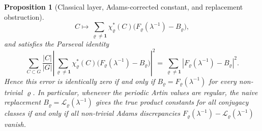 \documentclass[11pt,a4paper]{amsart}
\theoremstyle{plain}
\newtheorem{proposition}[theorem]{Proposition}
\theoremstyle{definition}
\theoremstyle{remark}
\begin{document}
\begin{proposition}[Classical layer, Adams-corrected constant, and replacement obstruction]
\begin{equation}
    C\longmapsto
    \sum_{\varrho\neq\mathbf1}
      \chi_\varrho^\ast(C)
      \bigl(F_\varrho(\lambda^{-1})-B_\varrho\bigr),
  \end{equation}
  and satisfies the Parseval identity
  \begin{equation}\label{eq:classical-layer-replacement-parseval}
    \sum_{C\subset G}\frac{|C|}{|G|}
    \left|\sum_{\varrho\neq\mathbf1}
      \chi_\varrho^\ast(C)
      \bigl(F_\varrho(\lambda^{-1})-B_\varrho\bigr)\right|^2
    =
    \sum_{\varrho\neq\mathbf1}
      \left|F_\varrho(\lambda^{-1})-B_\varrho\right|^2 .
  \end{equation}
  Hence this error is identically zero if and only if
  \(B_\varrho=F_\varrho(\lambda^{-1})\) for every non-trivial
  \(\varrho\).  In particular, whenever the periodic Artin values are regular,
  the naive replacement
  \(B_\varrho=\mathcal L_\varrho(\lambda^{-1})\) gives the true product
  constants for all conjugacy classes if and only if all non-trivial Adams
  discrepancies
  \(F_\varrho(\lambda^{-1})-\mathcal L_\varrho(\lambda^{-1})\) vanish.
\end{proposition}
\end{document}
